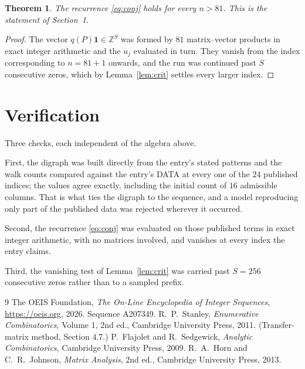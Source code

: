 \documentclass[11pt,a4paper]{article}
\theoremstyle{plain}
\newtheorem{theorem}{Theorem}
\theoremstyle{definition}
\begin{document}
\begin{theorem}
The recurrence \eqref{eq:conj} holds for every $n>81$. This is the statement of
Section~1.
\end{theorem}

\begin{proof}
The vector $q(P)\mathbf{1}\in\mathbb{Z}^{S}$ was formed by $81$ matrix--vector
products in exact integer arithmetic and the $u_j$ evaluated in turn. They vanish from the
index corresponding to $n=81+1$ onwards, and the run was continued past $S$ consecutive
zeros, which by Lemma~\ref{lem:crit} settles every larger index.
\end{proof}

\section{Verification}

Three checks, each independent of the algebra above.

First, the digraph was built directly from the entry's stated patterns and the walk counts
compared against the entry's DATA at every one of the $24$ published indices; the
values agree exactly, including the initial count of $16$ admissible columns. That is
what ties the digraph to the sequence, and a model reproducing only part of the published
data was rejected wherever it occurred.

Second, the recurrence \eqref{eq:conj} was evaluated on those published terms in exact
integer arithmetic, with no matrices involved, and vanishes at every index the entry claims.

Third, the vanishing test of Lemma~\ref{lem:crit} was carried past $S=256$ consecutive
zeros rather than to a sampled prefix.

\begin{thebibliography}{9}
 The OEIS Foundation, \emph{The On-Line Encyclopedia of Integer
Sequences}, \url{https://oeis.org}, 2026. Sequence A207349.
 R.~P.~Stanley, \emph{Enumerative Combinatorics}, Volume 1, 2nd ed.,
Cambridge University Press, 2011. (Transfer-matrix method, Section 4.7.)
 P.~Flajolet and R.~Sedgewick, \emph{Analytic Combinatorics}, Cambridge
University Press, 2009.
 R.~A.~Horn and C.~R.~Johnson, \emph{Matrix Analysis}, 2nd ed., Cambridge
University Press, 2013.
\end{thebibliography}
\end{document}
